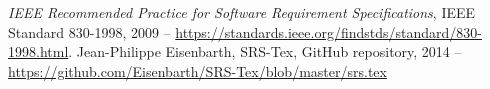 
\begingroup
\renewcommand{\chapter}[2]{}%

\begin{thebibliography}{1}
    \textit{IEEE Recommended Practice for Software Requirement
      Specifications}, IEEE Standard 830-1998, 2009 -- \url{
      https://standards.ieee.org/findstds/standard/830-1998.html}.
    Jean-Philippe Eisenbarth, SRS-Tex, GitHub repository, 2014 -- 
      \url{https://github.com/Eisenbarth/SRS-Tex/blob/master/srs.tex}
\end{thebibliography}

\endgroup
